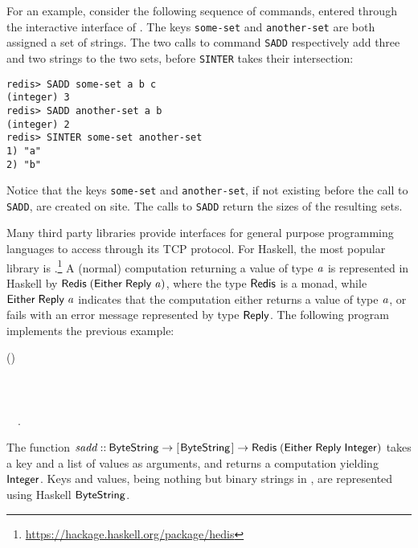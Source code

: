 For an example, consider the following sequence of commands, entered through the
interactive interface of \Redis{}. The keys \texttt{some-set} and
\texttt{another-set} are both assigned a set of strings. The two calls to
command \texttt{SADD} respectively add three and two strings to the two sets,
before \texttt{SINTER} takes their intersection:
\begin{Verbatim}[xleftmargin=.4in]
redis> SADD some-set a b c
(integer) 3
redis> SADD another-set a b
(integer) 2
redis> SINTER some-set another-set
1) "a"
2) "b"
\end{Verbatim}
\noindent Notice that the keys \texttt{some-set} and \texttt{another-set}, if
not existing before the call to \texttt{SADD}, are created on site. The calls to
\texttt{SADD} return the sizes of the resulting sets.

Many third party libraries provide interfaces for general purpose programming
languages to access \Redis{} through its TCP protocol. For Haskell, the most
popular library is
\Hedis{}.\footnote{\url{https://hackage.haskell.org/package/hedis}}
A (normal) \Redis{} computation returning a value of type \ensuremath{\Varid{a}} is represented in
Haskell by \ensuremath{\Conid{Redis}\;(\Conid{Either}\;\Conid{Reply}\;\Varid{a})}, where the type \ensuremath{\Conid{Redis}} is a monad, while
\ensuremath{\Conid{Either}\;\Conid{Reply}\;\Varid{a}} indicates that the computation either returns a value of type
\ensuremath{\Varid{a}}, or fails with an error message represented by type \ensuremath{\Conid{Reply}}. The following
program implements the previous example:
\begin{hscode}\SaveRestoreHook
{}%
%
%
\>[B]{}\mathbin{::}\;(\;){}\<[E]%
\\
\>[B]{}\mathrel{=}\<[E]%
\\
\>[B]{}\<[5]%
\>[5]{}\;\<[E]%
\\
\>[B]{}\<[5]%
\>[5]{}\;\<[E]%
\\
\>[B]{}\<[5]%
\>[5]{}~~.{}\<[E]%
\ColumnHook
\end{hscode}\resethooks
The function \ensuremath{\Varid{sadd}\mathbin{::}\Conid{ByteString}\to [\mskip1.5mu \Conid{ByteString}\mskip1.5mu]\to \Conid{Redis}\;(\Conid{Either}\;\Conid{Reply}\;\Conid{Integer})} takes a key and a list of values as arguments, and returns a
\Redis{} computation yielding \ensuremath{\Conid{Integer}}. Keys and values, being nothing but
binary strings in \Redis{}, are represented using Haskell \ensuremath{\Conid{ByteString}}.


